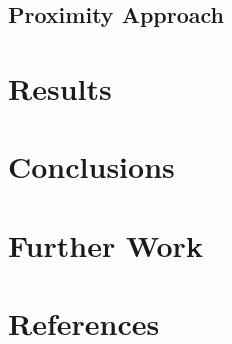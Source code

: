 \documentclass[preprint,3p,12pt]{elsarticle}
\begin{document}


\subsection{Proximity Approach}
\label{process:proximity}



\section{Results}
\label{results}



\section{Conclusions}
\label{conclusions}


\section{Further Work}
\label{further work}



\section{References}
\label{references}
\nocite{*}


\end{document}
